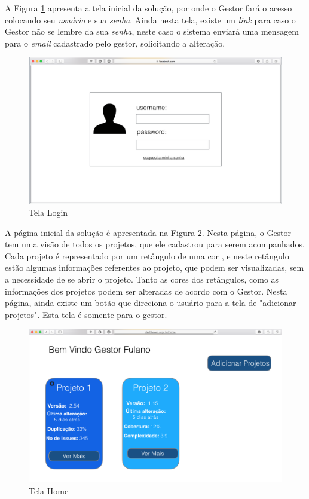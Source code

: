 A Figura \ref{img:telaLogin} apresenta a tela inicial da solução, por onde o Gestor fará o acesso colocando seu \textit{usuário} e sua \textit{senha}. Ainda nesta tela, existe um \textit{link} para caso o Gestor não se lembre da sua \textit{senha}, neste caso o sistema enviará uma mensagem para o \textit{email} cadastrado pelo gestor, solicitando a alteração.

\graphicspath{{figuras/}}
\begin{figure}
\centering
\includegraphics[scale=0.60]{telaLogin.png}
\caption{Tela Login}
\label{img:telaLogin}
\end{figure}

A página inicial da solução é apresentada na Figura \ref{img:telaHome}. Nesta página, o Gestor tem uma visão de todos os projetos, que ele cadastrou para serem acompanhados. Cada projeto é representado por um retângulo de uma cor , e neste retângulo estão algumas informações referentes ao projeto, que podem ser visualizadas, sem a necessidade de se abrir o projeto. Tanto as cores dos retângulos, como as informações dos projetos podem ser alteradas de acordo com o Gestor. Nesta página, ainda existe um botão que direciona o usuário para a tela de "adicionar projetos". Esta tela é somente para o gestor.
 
\graphicspath{{figuras/}}
\begin{figure}
\centering
\includegraphics[scale=0.60]{telaHome2.png}
\caption{Tela Home}
\label{img:telaHome}
\end{figure} 

